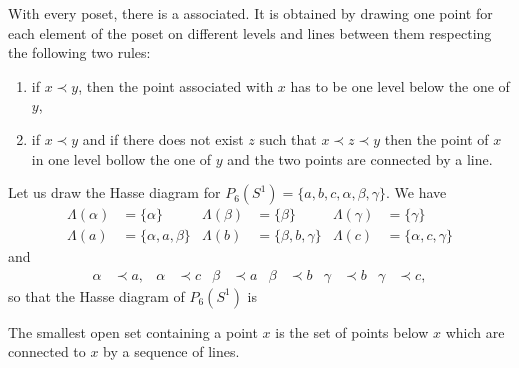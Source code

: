 With every poset, there is a  associated. It is obtained by drawing one point for each element of the poset on different levels and lines between them respecting the following two rules:
\begin{enumerate}
\item if $x\prec y$, then the point associated with $x$ has to be one level below the one of $y$,
\item if $x\prec y$ and if there does not exist $z$ such that $x\prec z\prec y$ then the point of $x$ in one level bollow the one of $y$ and the two points are connected by a line.
\end{enumerate}
Let us draw the Hasse diagram for $P_6(S^1)=\{ a,b,c,\alpha,\beta,\gamma \}$. We have 
\begin{align*}
\Lambda(\alpha)&=\{ \alpha \}		&\Lambda(\beta)&=\{ \beta \}		&\Lambda(\gamma)&=\{ \gamma \}\\
\Lambda(a)&=\{ \alpha,a,\beta \}	&\Lambda(b)&=\{ \beta,b,\gamma \}	&\Lambda(c)&=\{ \alpha,c,\gamma \}
\end{align*}
and
\begin{align*}
\alpha&\prec a,	&\alpha&\prec c	&\beta&\prec a	&\beta&\prec b	&\gamma&\prec b	&\gamma&\prec c,
\end{align*}
so that the Hasse diagram of $P_6(S^1)$ is
\begin{center}

\end{center}
The smallest open set containing a point $x$ is the set of points below $x$ which are connected to $x$ by a sequence of lines.
